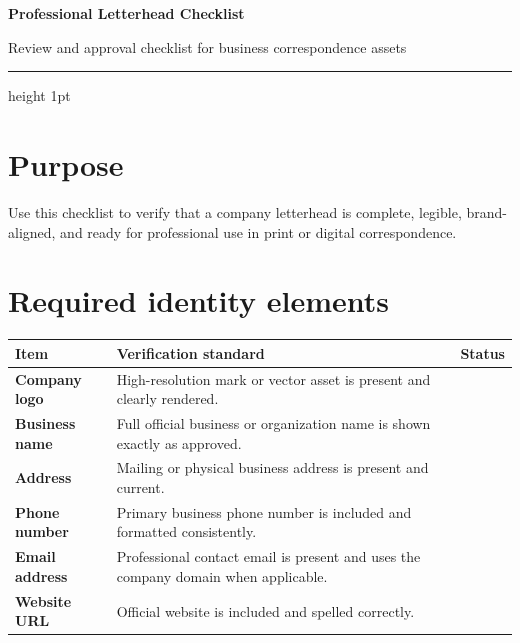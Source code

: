 \documentclass[11pt]{article}
\begin{document}
{\LARGE\bfseries Professional Letterhead Checklist}\par
\vspace{0.4em}
{\large Review and approval checklist for business correspondence assets}\par
\vspace{0.8em}
\hrule height 1pt
\vspace{1em}

\section*{Purpose}
Use this checklist to verify that a company letterhead is complete, legible, brand-aligned, and ready for professional use in print or digital correspondence.

\section*{Required identity elements}
\begin{tabularx}{\textwidth}{>{\bfseries}p{} X >{\centering\arraybackslash}p{}}
\toprule
Item & Verification standard & Status \\
\midrule
Company logo & High-resolution mark or vector asset is present and clearly rendered. & \fbox{\rule{0pt}{1.2ex}\hspace{1.2ex}} \\
Business name & Full official business or organization name is shown exactly as approved. & \fbox{\rule{0pt}{1.2ex}\hspace{1.2ex}} \\
Address & Mailing or physical business address is present and current. & \fbox{\rule{0pt}{1.2ex}\hspace{1.2ex}} \\
Phone number & Primary business phone number is included and formatted consistently. & \fbox{\rule{0pt}{1.2ex}\hspace{1.2ex}} \\
Email address & Professional contact email is present and uses the company domain when applicable. & \fbox{\rule{0pt}{1.2ex}\hspace{1.2ex}} \\
Website URL & Official website is included and spelled correctly. & \fbox{\rule{0pt}{1.2ex}\hspace{1.2ex}} \\
\bottomrule
\end{tabularx}
\end{document}
